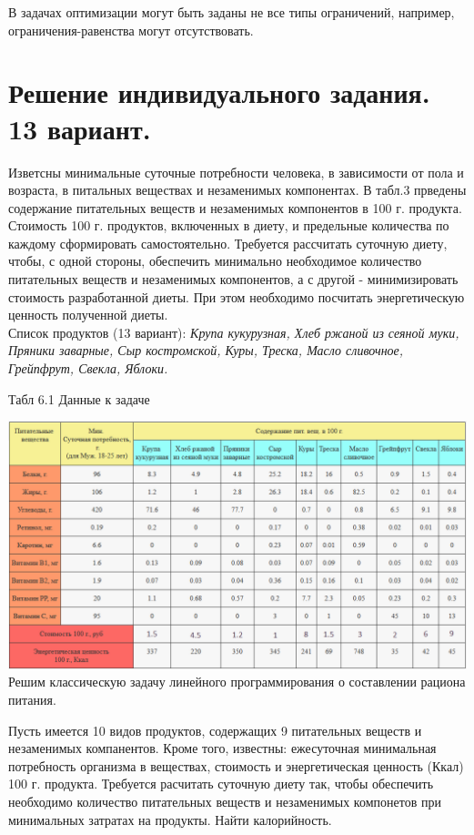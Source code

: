 \documentclass[a4paper, 12pt]{article}
\begin{document}
В задачах оптимизации могут быть заданы не все типы ограничений, например, ограничения-равенства могут отсутствовать.
\section{Решение индивидуального задания. 13 вариант.}
Изветсны минимальные суточные потребности человека, в зависимости от пола и возраста, в питальных веществах и незаменимых компонентах. В табл.3 прведены содержание питательных веществ и незаменимых компонентов в 100 г. продукта. Стоимость 100 г. продуктов, включенных в диету, и предельные количества по каждому сформировать самостоятельно. Требуется рассчитать суточную диету, чтобы, с одной стороны, обеспечить минимально необходимое количество питательных веществ и незаменимых компонентов, а с другой - минимизировать стоимость разработанной диеты. При этом необходимо посчитать энергетическую ценность полученной диеты. \\

Список продуктов (13 вариант):
\textit{Крупа кукурузная, Хлеб ржаной из сеяной муки, Пряники заварные, Сыр костромской, Куры, Треска, Масло сливочное, Грейпфрут, Свекла, Яблоки.}\\

\begin{center}
  Табл 6.1 Данные к задаче
\end{center}
\includegraphics[width=\textwidth]{6-5.png}\\

Решим классическую задачу линейного программирования о составлении рациона питания.

Пусть имеется 10 видов продуктов, содержащих 9 питательных веществ и незаменимых компанентов. Кроме того, известны: ежесуточная минимальная потребность организма в веществах, стоимость и энергетическая ценность (Ккал) 100 г. продукта. Требуется расчитать суточную диету так, чтобы обеспечить необходимо количество питательных веществ и незаменимых компонетов при минимальных затратах на продукты. Найти калорийность.
\end{document}
